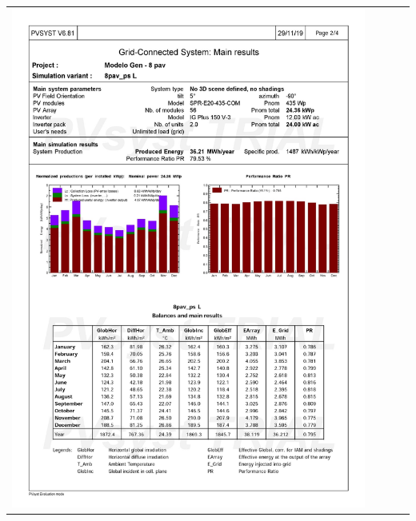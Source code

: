 \begin{table}[H]
    \centering
    \begin{tabular}{l}
        \includegraphics[width=0.9\textwidth]{figures/attachments/resultpv16.jpg}
    \end{tabular}
\end{table}
\pagebreak
